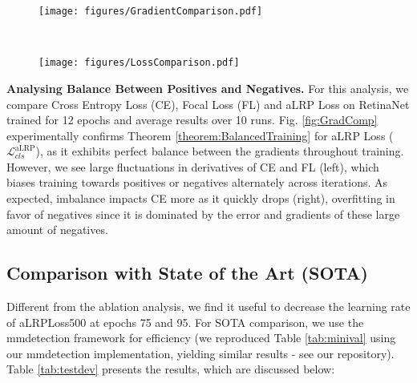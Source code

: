 \documentclass{article}
\newcommand{\comment}[1]{}
\begin{document}
\begin{figure*}[t!]
    \begin{subfigure}[t]{0.45\textwidth}
        \centering
        \texttt{[image: figures/GradientComparison.pdf]}
    \end{subfigure}
    ~
    \begin{subfigure}[t]{0.42\textwidth}
        \centering
        \texttt{[image: figures/LossComparison.pdf]}
    \end{subfigure}    
    \caption{\textbf{(left)} The rate of the total gradient magnitudes of negatives to positives. \textbf{(right)} Loss values. \label{fig:GradComp}}
\end{figure*}
\textbf{Analysing Balance Between Positives and Negatives.}
For this analysis, we compare Cross Entropy Loss (CE), Focal Loss (FL) and aLRP Loss on RetinaNet trained for 12 epochs and average results over 10 runs. Fig. \ref{fig:GradComp} experimentally confirms Theorem \ref{theorem:BalancedTraining} for aLRP Loss ($\mathcal{L}^{\mathrm{aLRP}}_{cls}$), as it exhibits perfect balance between the gradients throughout training. However, we see large fluctuations in derivatives of CE and FL (left), which biases training towards positives or negatives alternately across iterations. As expected, imbalance impacts CE more as it quickly drops (right), overfitting in favor of negatives since it is dominated by the error and gradients of these large amount of negatives.

\comment{
\textbf{It is crucial to set ${L_{ij}}^*$ as the target error when an example is ranked properly.} Fig. \ref{fig:GradComp} presents a case where ${L_{ij}}^*$ is set to 0 (i.e. minimum value of aLRP). For this case, the training continues properly similar to aLRP Loss up to a point and then diverges. Note that this occurs when the positives start to be ranked properly but are still assigned gradients since ${L_{ij}}^*-{L_{ij}} \neq 0$ due to the nonzero localization error. This causes $\sum \limits_{i \in \mathcal{P}} \abs{\frac{\partial \mathcal{L}}{\partial s_i}} > \sum \limits_{i \in \mathcal{N}} \abs{\frac{\partial \mathcal{L}}{\partial s_i}}$, violating Theorem \ref{theorem:BalancedTraining} (compare min-rate and max-rate in Fig. \ref{fig:GradComp}). Therefore, assigning proper targets as indicated in Section \ref{sec:generalization} is crucial for balanced training.
}





\subsection{Comparison with State of the Art (SOTA)}
\label{sect:comparison}
Different from the ablation analysis, we find it useful to decrease the learning rate of aLRPLoss500 at epochs 75 and 95. For SOTA comparison, we use the mmdetection framework \cite{mmdetection} for efficiency (we reproduced Table \ref{tab:minival} using our mmdetection implementation, yielding similar results - see our repository). Table \ref{tab:testdev} presents the results, which are discussed below: 
\end{document}
